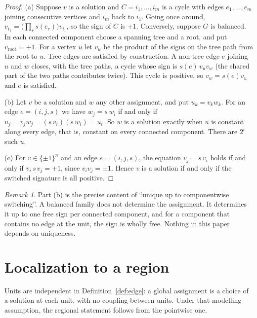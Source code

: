 \documentclass[11pt]{article}
\theoremstyle{plain}
\theoremstyle{definition}
\theoremstyle{remark}
\newtheorem{remark}[theorem]{Remark}
\begin{document}
\begin{proof}
(a) Suppose $v$ is a solution and $C=i_1,\dots,i_m$ is a cycle with edges $e_1,\dots,e_m$ joining consecutive vertices and $i_m$ back to $i_1$. Going once around, $v_{i_1}=\bigl(\prod_r s(e_r)\bigr)v_{i_1}$, so the sign of $C$ is $+1$. Conversely, suppose $G$ is balanced. In each connected component choose a spanning tree and a root, and put $v_{\mathrm{root}}=+1$. For a vertex $u$ let $v_u$ be the product of the signs on the tree path from the root to $u$. Tree edges are satisfied by construction. A non-tree edge $e$ joining $u$ and $w$ closes, with the tree paths, a cycle whose sign is $s(e)\,v_uv_w$ (the shared part of the two paths contributes twice). This cycle is positive, so $v_w=s(e)v_u$ and $e$ is satisfied.

(b) Let $v$ be a solution and $w$ any other assignment, and put $u_k=v_kw_k$. For an edge $e=(i,j,s)$ we have $w_j=s\,w_i$ if and only if $u_j=v_jw_j=(s\,v_i)(s\,w_i)=u_i$. So $w$ is a solution exactly when $u$ is constant along every edge, that is, constant on every connected component. There are $2^c$ such $u$.

(c) For $v\in\{\pm1\}^n$ and an edge $e=(i,j,s)$, the equation $v_j=s\,v_i$ holds if and only if $v_i\,s\,v_j=+1$, since $v_iv_j=\pm1$. Hence $v$ is a solution if and only if the switched signature is all positive.
\end{proof}

\begin{remark}
Part (b) is the precise content of ``unique up to componentwise switching''. A balanced family does not determine the assignment. It determines it up to one free sign per connected component, and for a component that contains no edge at the unit, the sign is wholly free. Nothing in this paper depends on uniqueness.
\end{remark}

\section{Localization to a region}\label{sec:loc}

Units are independent in Definition~\ref{def:edge}: a global assignment is a choice of a solution at each unit, with no coupling between units. Under that modelling assumption, the regional statement follows from the pointwise one.
\end{document}
